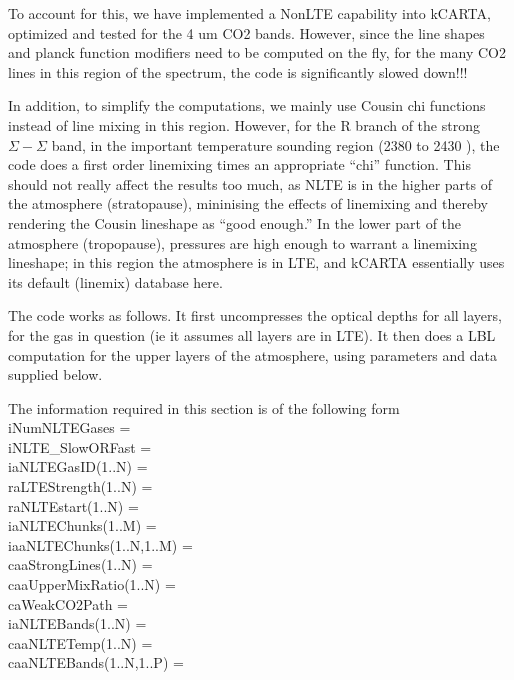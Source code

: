 \documentclass[12pt]{article}
\newcommand{\kc}{\textsf{kCARTA}\xspace}
\newcommand{\ttab}{\indent\indent}
\begin{document}
{{To account for this, we have implemented a NonLTE capability into \kc, 
optimized and tested for the 4 um CO2 bands. However, since the line shapes 
and planck function modifiers need to be computed on the fly, for the many CO2 
lines in this region of the spectrum, the code is significantly slowed down!!!

In addition, to simplify the computations, we mainly use Cousin chi functions 
instead of line mixing in this region. However, for the R branch of the strong
$\Sigma-\Sigma$ band, in the important temperature sounding region (2380 to 
2430 \wn), the code does a first order linemixing times an appropriate ``chi''
function. This should not really affect the results too much, as NLTE is in
the higher parts of the atmosphere (stratopause), mininising the effects of 
linemixing and thereby rendering the Cousin lineshape as ``good enough.'' In 
the lower part of the atmosphere (tropopause), pressures are high enough to 
warrant a linemixing lineshape; in this region the atmosphere is in LTE, and
\kc essentially uses its default (linemix) database here.

The code works as follows. It first uncompresses the optical depths for all 
layers, for the gas in question (ie it assumes all layers are in LTE). It 
then does a LBL computation for the upper layers of the atmosphere, using 
parameters and data supplied below.

The information required in this section is of the following form\\
\medskip
\ttab iNumNLTEGases             = \\
\ttab iNLTE\_SlowORFast         = \\
\ttab iaNLTEGasID(1..N)         = \\
\ttab raLTEStrength(1..N)       = \\
\ttab raNLTEstart(1..N)         = \\
\ttab iaNLTEChunks(1..M)        = \\
\ttab iaaNLTEChunks(1..N,1..M)  = \\
\ttab caaStrongLines(1..N)      = \\
\ttab caaUpperMixRatio(1..N)    = \\
\ttab caWeakCO2Path             = \\
\ttab iaNLTEBands(1..N)         = \\
\ttab caaNLTETemp(1..N)         = \\
\ttab caaNLTEBands(1..N,1..P)   = \\
\ttab

}}
\end{document}
